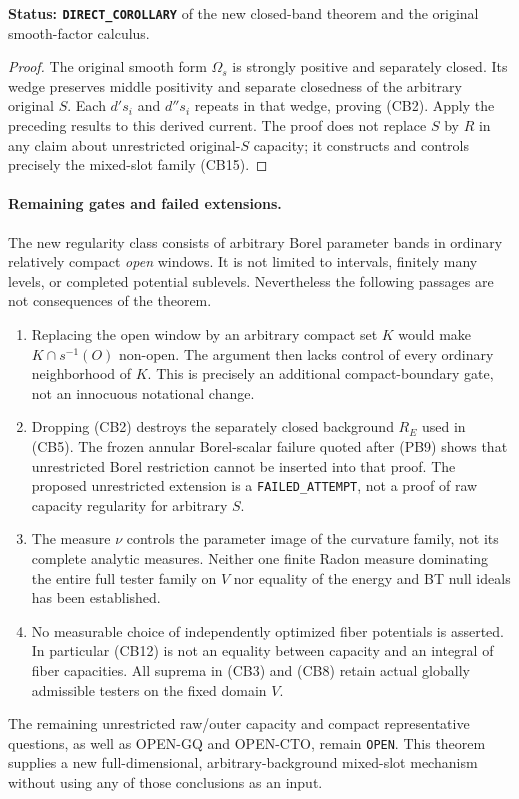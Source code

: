 \documentclass[11pt,a4paper]{article}
\numberwithin{equation}{section}
\theoremstyle{definition}
\theoremstyle{remark}
\begin{document}
\noindent\textbf{Status: \texttt{DIRECT\_COROLLARY}} of the
new closed-band theorem and the original smooth-factor calculus.

\begin{proof}
The original smooth form $\Omega_s$ is strongly positive and
separately closed. Its wedge preserves middle positivity and
separate closedness of the arbitrary original $S$. Each
$d's_i$ and $d''s_i$ repeats in that wedge, proving (CB2).
Apply the preceding results to this derived current. The proof
does not replace $S$ by $R$ in any claim about unrestricted
original-$S$ capacity; it constructs and controls precisely the
mixed-slot family (CB15).
\end{proof}

\paragraph{Remaining gates and failed extensions.}
The new regularity class consists of arbitrary Borel parameter
bands in ordinary relatively compact \emph{open} windows. It is
not limited to intervals, finitely many levels, or completed
potential sublevels. Nevertheless the following passages are
not consequences of the theorem.
\begin{enumerate}
\item Replacing the open window by an arbitrary compact set $K$
would make $K\cap s^{-1}(O)$ non-open. The argument then lacks
control of every ordinary neighborhood of $K$. This is precisely
an additional compact-boundary gate, not an innocuous notational
change.
\item Dropping (CB2) destroys the separately closed background
$R_E$ used in (CB5). The frozen annular Borel-scalar failure
quoted after (PB9) shows that unrestricted Borel restriction
cannot be inserted into that proof. The proposed unrestricted
extension is a \texttt{FAILED\_ATTEMPT}, not a proof of raw
capacity regularity for arbitrary $S$.
\item The measure $\nu$ controls the parameter image of the
curvature family, not its complete analytic measures. Neither
one finite Radon measure dominating the entire full tester
family on $V$ nor equality of the energy and BT null ideals
has been established.
\item No measurable choice of independently optimized fiber
potentials is asserted. In particular (CB12) is not an equality
between capacity and an integral of fiber capacities. All
suprema in (CB3) and (CB8) retain actual globally admissible
testers on the fixed domain $V$.
\end{enumerate}
The remaining unrestricted raw/outer capacity and compact
representative questions, as well as OPEN-GQ and OPEN-CTO, remain
\texttt{OPEN}. This theorem supplies a new full-dimensional,
arbitrary-background mixed-slot mechanism without using any of
those conclusions as an input.
\end{document}
